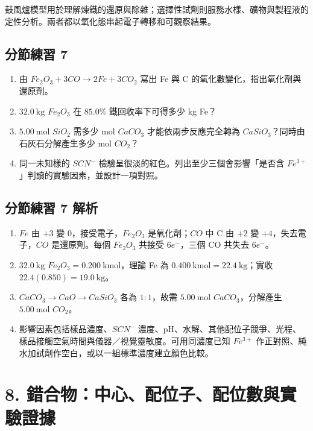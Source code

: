 \documentclass[11pt,a4paper]{article}
\providecommand{\tightlist}{%
  \setlength{\itemsep}{0pt}\setlength{\parskip}{0pt}}
\begin{document}
鼓風爐模型用於理解煉鐵的還原與除雜；選擇性試劑則服務水樣、礦物與製程液的定性分析。兩者都以氧化態串起電子轉移和可觀察結果。

\subsection{分節練習 7}\label{ux5206ux7bc0ux7df4ux7fd2-7}

\begin{enumerate}
\def\labelenumi{\arabic{enumi}.}
\tightlist
\item
  由 \(Fe_2O_3+3CO\rightarrow2Fe+3CO_2\) 寫出 Fe 與 C 的氧化數變化，指出氧化劑與還原劑。
\item
  \(32.0\ \mathrm{kg}\) \(Fe_2O_3\) 在 \(85.0\%\) 鐵回收率下可得多少 kg Fe？
\item
  \(5.00\ \mathrm{mol}\) \(SiO_2\) 需多少 mol \(CaCO_3\) 才能依兩步反應完全轉為 \(CaSiO_3\)？同時由石灰石分解產生多少 mol \(CO_2\)？
\item
  同一未知樣的 \(SCN^-\) 檢驗呈很淡的紅色。列出至少三個會影響「是否含 \(Fe^{3+}\)」判讀的實驗因素，並設計一項對照。
\end{enumerate}

\subsection{分節練習 7 解析}\label{ux5206ux7bc0ux7df4ux7fd2-7-ux89e3ux6790}

\begin{enumerate}
\def\labelenumi{\arabic{enumi}.}
\tightlist
\item
  \(Fe\) 由 \(+3\) 變 \(0\)，接受電子，\(Fe_2O_3\) 是氧化劑；\(CO\) 中 C 由 \(+2\) 變 \(+4\)，失去電子，\(CO\) 是還原劑。每個 \(Fe_2O_3\) 共接受 \(6e^-\)，三個 CO 共失去 \(6e^-\)。
\item
  \(32.0\ \mathrm{kg}\) \(Fe_2O_3=0.200\ \mathrm{kmol}\)，理論 Fe 為 \(0.400\ \mathrm{kmol}=22.4\ \mathrm{kg}\)；實收 \(22.4(0.850)=19.0\ \mathrm{kg}\)。
\item
  \(CaCO_3\rightarrow CaO\rightarrow CaSiO_3\) 各為 \(1:1\)，故需 \(5.00\ \mathrm{mol}\) \(CaCO_3\)，分解產生 \(5.00\ \mathrm{mol}\) \(CO_2\)。
\item
  影響因素包括樣品濃度、\(SCN^-\) 濃度、pH、水解、其他配位子競爭、光程、樣品接觸空氣時間與儀器／視覺靈敏度。可用同濃度已知 \(Fe^{3+}\) 作正對照、純水加試劑作空白，或以一組標準濃度建立顏色比較。
\end{enumerate}

\section{8. 錯合物：中心、配位子、配位數與實驗證據}\label{ux932fux5408ux7269ux4e2dux5fc3ux914dux4f4dux5b50ux914dux4f4dux6578ux8207ux5be6ux9a57ux8b49ux64da}
\end{document}
